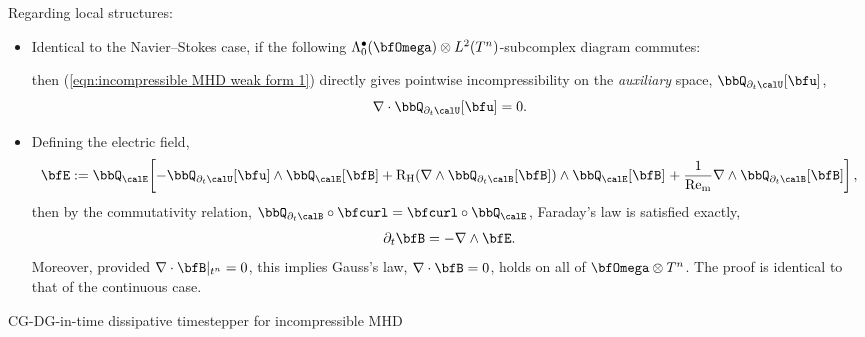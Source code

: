     Regarding local structures:
    \begin{itemize}
        \item  Identical to the Navier--Stokes case, if the following $\Lambda_{0}^{\bullet}(\bfOmega)\otimes L^{2}(T^{n})$-subcomplex diagram commutes:
        \begin{center}\end{center}
        then (\ref{eqn:incompressible MHD weak form 1}) directly gives pointwise incompressibility on the \emph{auxiliary} space, $\bbQ_{\partial_{t}\calU}[\bfu]$,
        \begin{equation}
            \nabla\cdot\bbQ_{\partial_{t}\calU}[\bfu]  =  0.
        \end{equation}

        \item  Defining the electric field,
        \begin{equation}
            \bfE
            :=  \bbQ_{\calE}\!\left[- \bbQ_{\partial_{t}\calU}[\bfu]\wedge\bbQ_{\calE}[\bfB]
            + \rmRH(\nabla\wedge\bbQ_{\partial_{t}\calB}[\bfB])\wedge\bbQ_{\calE}[\bfB]\tall
            + \frac{1}{\rmRem}\nabla\wedge\bbQ_{\partial_{t}\calB}[\bfB]\right],
        \end{equation}
        then by the commutativity relation, $\bbQ_{\partial_{t}\calB}\circ\bfcurl = \bfcurl\circ\bbQ_{\calE}$, Faraday's law is satisfied exactly,
        \begin{equation}
            \partial_{t}\bfB  =  - \nabla\wedge\bfE.
        \end{equation}
        Moreover, provided $\nabla\cdot\bfB|_{t^{n}} = 0$, this implies Gauss's law, $\nabla\cdot\bfB = 0$, holds on all of $\bfOmega\otimes T^{n}$. The proof is identical to that of the continuous case.
    \end{itemize}

    \line

    \begin{example}{CG-DG-in-time dissipative timestepper for incompressible MHD}
    \end{example}
